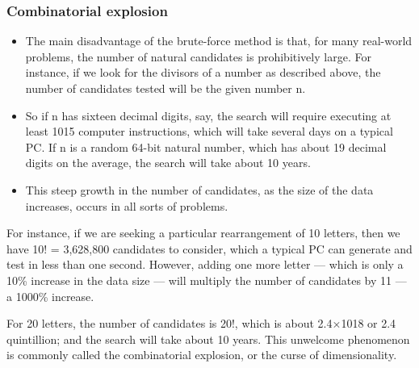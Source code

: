 \documentclass{beamer}
\begin{document}
\begin{frame}
\frametitle{Combinatorial explosion}
\begin{itemize}
	\item The main disadvantage of the brute-force method is that, for many real-world problems, the number of natural candidates is prohibitively large. For instance, if we look for the divisors of a number as described above, the number of candidates tested will be the given number n. 
	\item So if n has sixteen decimal digits, say, the search will require executing at least 1015 computer instructions, which will take several days on a typical PC. If n is a random 64-bit natural number, which has about 19 decimal digits on the average, the search will take about 10 years.
	\item  This steep growth in the number of candidates, as the size of the data increases, occurs in all sorts of problems. 
\end{itemize}

\end{frame}


\begin{frame}
For instance, if we are seeking a particular rearrangement of 10 letters, then we have 10! = 3,628,800 candidates to consider, which a typical PC can generate and test in less than one second. However, adding one more letter — which is only a 10\% increase in the data size — will multiply the number of candidates by 11 — a 1000\% increase. 

For 20 letters, the number of candidates is 20!, which is about 2.4×1018 or 2.4 quintillion; and the search will take about 10 years. This unwelcome phenomenon is commonly called the combinatorial explosion, or the curse of dimensionality.
\end{frame}
\end{document}
